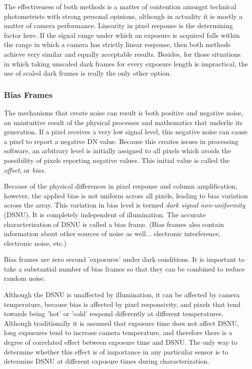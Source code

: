 \documentclass[10pt]{article}
\begin{document}
The effectiveness of both methods is a matter of contention amongst technical photometrists with strong personal opinions, although in actuality it is mostly a matter of camera performance. Linearity in pixel response is the determining factor here. If the signal range under which an exposure is acquired falls within the range in which a camera has strictly linear response, then both methods achieve very similar and equally acceptable results. Besides, for those situations in which taking unscaled dark frames for every exposure length is impractical, the use of scaled dark frames is really the only other option.

\subsubsection{Bias Frames}
\label{sec:biasframes}

The mechanisms that create noise can result is both positive and negative noise, an unintuitive result of the physical processes and mathematics that underlie its generation. If a pixel receives a very low signal level, this negative noise can cause a pixel to report a negative DN value. Because this creates issues in processing software, an arbitrary level is initially assigned to all pixels which avoids the possibility of pixels reporting negative values. This initial value is called the \emph{offset}, or \emph{bias}.

Because of the physical differences in pixel response and column amplification, however, the applied bias is not uniform across all pixels, leading to bias variation across the array. This variation in bias level is termed \emph{dark signal non-uniformity} (DSNU). It is completely independent of illumination. The accurate characterization of DSNU is called a bias frame. (Bias frames also contain information about other sources of noise as well... electronic interference, electronic noise, etc.)

Bias frames are zero second 'exposures' under dark conditions. It is important to take a substantial number of bias frames so that they can be combined to reduce random noise.

Although the DSNU is unaffected by illumination, it can be affected by camera temperature, because bias is affected by pixel responsivity, and pixels that tend towards being 'hot' or 'cold' respond differently at different temperatures.  Although traditionally it is assumed that exposure time does not affect DSNU, long exposures tend to increase camera temperature, and therefore there is a degree of correlated effect between exposure time and DSNU. The only way to determine whether this effect is of importance in any particular sensor is to determine DSNU at different exposure times during characterization.
\end{document}
